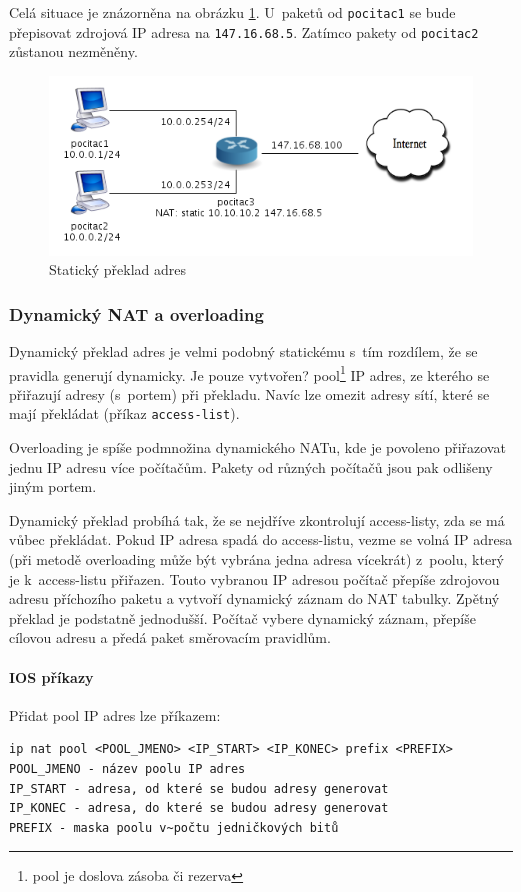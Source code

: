 Celá situace je znázorněna na obrázku \ref{fig:nat1}. U~paketů od \verb|pocitac1| se bude přepisovat zdrojová IP adresa na \verb|147.16.68.5|. Zatímco pakety od \verb|pocitac2| zůstanou nezměněny.

\begin{figure}[h]
\begin{center}
\includegraphics[width=12cm]{figures/nat1}
\caption{Statický překlad adres}
\label{fig:nat1}
\end{center}
\end{figure}

\newpage


\subsubsection{Dynamický NAT a overloading}
Dynamický překlad adres je velmi podobný statickému s~tím rozdílem, že se pravidla generují dynamicky. Je pouze vytvořen? pool\footnote{pool je doslova zásoba či rezerva} IP adres, ze kterého se přiřazují adresy (s~portem) při překladu. Navíc lze omezit adresy sítí, které se mají překládat (příkaz \verb|access-list|).

Overloading je spíše podmnožina dynamického NATu, kde je povoleno přiřazovat jednu IP adresu více počítačům. Pakety od různých počítačů jsou pak odlišeny jiným portem.

Dynamický překlad probíhá tak, že se nejdříve zkontrolují access-listy, zda se má vůbec překládat. Pokud IP adresa spadá do access-listu, vezme se volná IP adresa (při metodě overloading může být vybrána jedna adresa vícekrát) z~poolu, který je k~access-listu přiřazen. Touto vybranou IP adresou počítač přepíše zdrojovou adresu příchozího paketu a vytvoří dynamický záznam do NAT tabulky. Zpětný překlad je podstatně jednodušší. Počítač vybere dynamický záznam, přepíše cílovou adresu a předá paket směrovacím pravidlům.

\paragraph{IOS příkazy}
Přidat pool IP adres lze příkazem:
\begin{verbatim}
ip nat pool <POOL_JMENO> <IP_START> <IP_KONEC> prefix <PREFIX>
POOL_JMENO - název poolu IP adres
IP_START - adresa, od které se budou adresy generovat
IP_KONEC - adresa, do které se budou adresy generovat
PREFIX - maska poolu v~počtu jedničkových bitů
\end{verbatim} 

